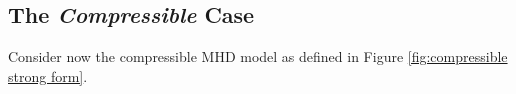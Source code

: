 \subsection*{The \emph{Compressible} Case}
    Consider now the compressible MHD model as defined in Figure \ref{fig:compressible strong form}.
